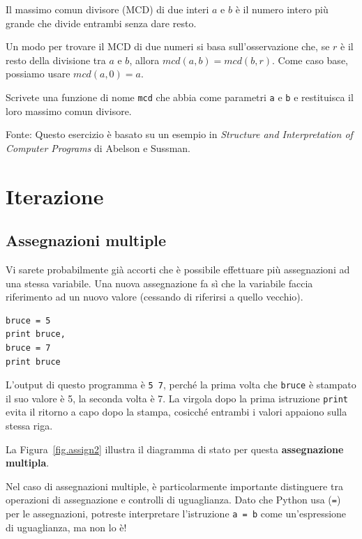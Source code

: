 \documentclass[10pt]{book}
\begin{document}
\vspace{0.2in}
\begin{exercise}

Il massimo comun divisore (MCD) di due interi $a$ e $b$ è il numero intero più grande che divide entrambi senza dare resto.  

Un modo per trovare il MCD di due numeri si basa sull'osservazione che, se $r$ è il resto della divisione tra $a$ e $b$, allora $mcd(a,
b) = mcd(b, r)$.  Come caso base, possiamo usare $mcd(a, 0) = a$.

Scrivete una funzione di nome
\verb"mcd" che abbia come parametri {\tt a} e {\tt b}
e restituisca il loro massimo comun divisore.

Fonte: Questo esercizio è basato su un esempio in {\em Structure and Interpretation of Computer Programs} di Abelson e Sussman.

\end{exercise}


\chapter{Iterazione}

\section{Assegnazioni multiple}

Vi sarete probabilmente già accorti che è possibile effettuare più assegnazioni ad una stessa variabile. Una nuova assegnazione fa sì che la variabile faccia riferimento ad un nuovo valore (cessando di riferirsi a quello vecchio).

\begin{verbatim}
bruce = 5
print bruce,
bruce = 7
print bruce
\end{verbatim}
%
L'output di questo programma è {\tt 5 7}, perché la prima volta che {\tt bruce} è stampato il suo valore è 5, la seconda volta è 7. La virgola dopo la prima istruzione {\tt print} evita il ritorno a capo dopo la stampa, cosicché entrambi i valori appaiono sulla stessa riga.

La Figura~\ref{fig.assign2} illustra il diagramma di stato per questa {\bf assegnazione multipla}. 

Nel caso di assegnazioni multiple, è particolarmente importante distinguere tra operazioni di assegnazione e controlli di uguaglianza.
Dato che Python usa ({\tt =}) per le assegnazioni, potreste interpretare l'istruzione {\tt a = b} come un'espressione di uguaglianza, ma non lo è!
\end{document}

